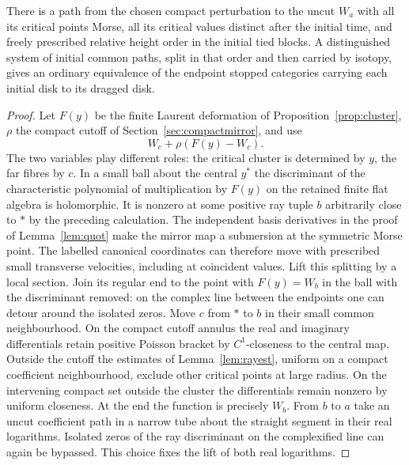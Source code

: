 \begin{lemma}\label{lem:regularpath}
There is a path from the chosen compact perturbation to the uncut $W_a$ with all its critical points Morse, all its critical values distinct after the initial time, and freely prescribed relative height order in the initial tied blocks. A distinguished system of initial common paths, split in that order and then carried by isotopy, gives an ordinary equivalence of the endpoint stopped categories carrying each initial disk to its dragged disk.
\end{lemma}

\begin{proof}
Let $F(y)$ be the finite Laurent deformation of Proposition~\ref{prop:cluster}, $\rho$ the compact cutoff of Section~\ref{sec:compactmirror}, and use
\[
                         W_c+\rho(F(y)-W_c).
\]
The two variables play different roles: the critical cluster is determined by $y$, the far fibres by $c$. In a small ball about the central $y^*$ the discriminant of the characteristic polynomial of multiplication by $F(y)$ on the retained finite flat algebra is holomorphic. It is nonzero at some positive ray tuple $b$ arbitrarily close to $*$ by the preceding calculation. The independent basis derivatives in the proof of Lemma~\ref{lem:quot} make the mirror map a submersion at the symmetric Morse point. The labelled canonical coordinates can therefore move with prescribed small transverse velocities, including at coincident values. Lift this splitting by a local section. Join its regular end to the point with $F(y)=W_b$ in the ball with the discriminant removed: on the complex line between the endpoints one can detour around the isolated zeros. Move $c$ from $*$ to $b$ in their small common neighbourhood. On the compact cutoff annulus the real and imaginary differentials retain positive Poisson bracket by $C^1$-closeness to the central map. Outside the cutoff the estimates of Lemma~\ref{lem:rayest}, uniform on a compact coefficient neighbourhood, exclude other critical points at large radius. On the intervening compact set outside the cluster the differentials remain nonzero by uniform closeness. At the end the function is precisely $W_b$. From $b$ to $a$ take an uncut coefficient path in a narrow tube about the straight segment in their real logarithms. Isolated zeros of the ray discriminant on the complexified line can again be bypassed. This choice fixes the lift of both real logarithms.


\end{proof}
